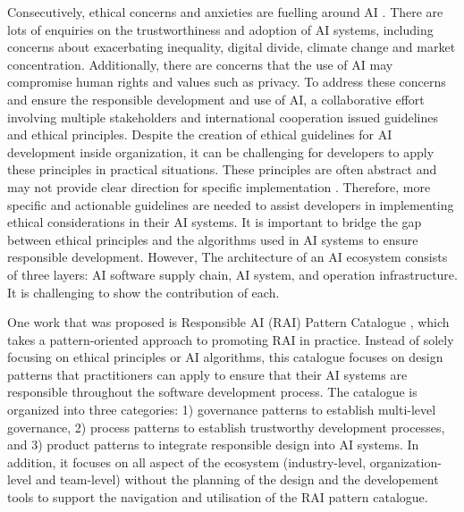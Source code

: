 \documentclass[conference]{IEEEtran}
\begin{document}
Consecutively, ethical concerns and anxieties are fuelling around AI \cite{DBLP}. There are lots of enquiries on the trustworthiness and adoption of AI systems, including concerns about exacerbating inequality, digital divide, climate change and market concentration. Additionally, there are concerns that the use of AI may compromise human rights and values such as privacy. To address these concerns and ensure the responsible development and use of AI, a collaborative effort involving multiple stakeholders and international cooperation issued guidelines and ethical principles. Despite the creation of ethical guidelines for AI development inside organization, it can be challenging for developers to apply these principles in practical situations. These principles are often abstract and may not provide clear direction for specific implementation \cite{abs-2111-09478}. Therefore, more specific and actionable guidelines are needed to assist developers in implementing ethical considerations in their AI systems. It is important to bridge the gap between ethical principles and the algorithms used in AI systems to ensure responsible development. However, The architecture of an AI ecosystem consists of three layers: AI software supply chain, AI system, and operation infrastructure. It is challenging to show the contribution of each.

One work that was proposed is Responsible AI (RAI) Pattern Catalogue \cite{catalogue}, which takes a pattern-oriented approach to promoting RAI in practice. Instead of solely focusing on ethical principles or AI algorithms, this catalogue focuses on design patterns that practitioners can apply to ensure that their AI systems are responsible throughout the software development process. The catalogue is organized into three categories: 1) governance patterns to establish multi-level governance, 2) process patterns to establish trustworthy development processes, and 3) product patterns to integrate responsible design into AI systems. In addition, it focuses on all aspect of the ecosystem (industry-level, organization-level and team-level) without the planning of the design and the developement tools to support the navigation and utilisation of the RAI pattern catalogue.
\end{document}
